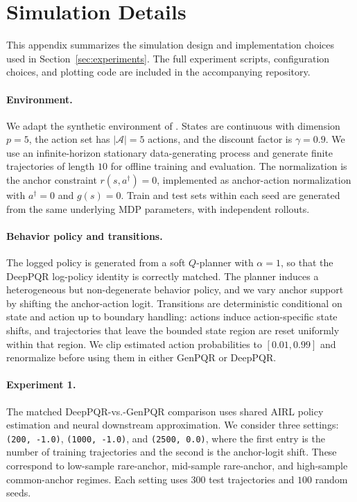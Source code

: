 \documentclass{article}
\newcommand{\1}{\mathbbm{1}}
\begin{document}
  

 




\appendix
 


 


\section{Simulation Details}
\label{app:simulation-details}

This appendix summarizes the simulation design and implementation choices used
in Section~\ref{sec:experiments}. The full experiment scripts, configuration
choices, and plotting code are included in the accompanying repository.

\paragraph{Environment.}
We adapt the synthetic environment of \citet{geng2020deep}. States are
continuous with dimension \(p=5\), the action set has \(|\mathcal A|=5\)
actions, and the discount factor is \(\gamma=0.9\). We use an infinite-horizon
stationary data-generating process and generate finite trajectories of length
\(10\) for offline training and evaluation. The normalization is the anchor
constraint \(r(s,a^\dagger)=0\), implemented as anchor-action normalization
with \(a^\dagger=0\) and \(g(s)=0\). Train and test sets within each seed are
generated from the same underlying MDP parameters, with independent rollouts.

\paragraph{Behavior policy and transitions.}
The logged policy is generated from a soft \(Q\)-planner with \(\alpha=1\), so
that the DeepPQR log-policy identity is correctly matched. The planner induces
a heterogeneous but non-degenerate behavior policy, and we vary anchor support
by shifting the anchor-action logit. Transitions are deterministic conditional
on state and action up to boundary handling: actions induce action-specific
state shifts, and trajectories that leave the bounded state region are reset
uniformly within that region. We clip estimated action probabilities to
\([0.01,0.99]\) and renormalize before using them in either GenPQR or DeepPQR.

\paragraph{Experiment 1.}
The matched DeepPQR-vs.-GenPQR comparison uses shared AIRL policy estimation
and neural downstream approximation. We consider three settings:
\texttt{(200, -1.0)}, \texttt{(1000, -1.0)}, and \texttt{(2500, 0.0)}, where
the first entry is the number of training trajectories and the second is the
anchor-logit shift. These correspond to low-sample rare-anchor, mid-sample
rare-anchor, and high-sample common-anchor regimes. Each setting uses \(300\)
test trajectories and \(100\) random seeds.
\end{document}
